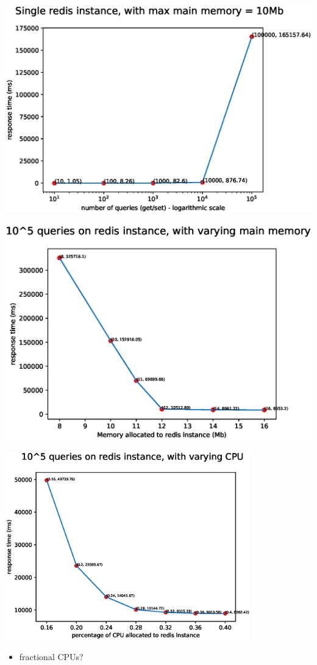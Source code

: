 \documentclass{beamer}
\begin{document}
\begin{frame}
    \includegraphics[width=\textwidth]{fig2.eps}
\end{frame}


\begin{frame}
    \includegraphics[width=\textwidth]{fig3.eps}
\end{frame}

\begin{frame}
\begin{center}
    \includegraphics[width=0.8\textwidth]{fig4.eps}
\end{center}
    \begin{itemize}
        \pause\item fractional CPUs?
    \end{itemize}
\end{frame}
\end{document}
